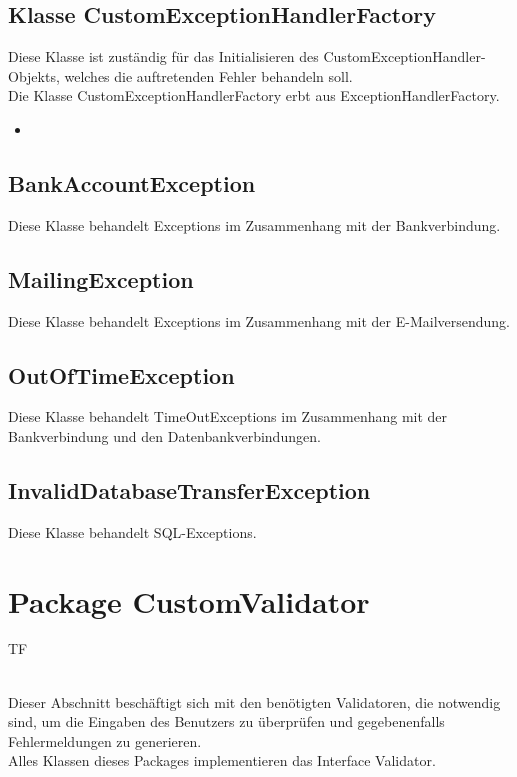 	\subsection{Klasse CustomExceptionHandlerFactory}
	Diese Klasse ist zuständig für das  Initialisieren des CustomExceptionHandler-Objekts, welches die auftretenden Fehler behandeln soll.\\
	Die Klasse CustomExceptionHandlerFactory erbt aus ExceptionHandlerFactory.
	\begin{itemize}
		\item \override
	\end{itemize}
	
	\subsection{BankAccountException}
	Diese Klasse behandelt Exceptions im Zusammenhang mit der Bankverbindung.
	
	\subsection{MailingException}
	Diese Klasse behandelt Exceptions im Zusammenhang mit der E-Mailversendung.
	
	\subsection{OutOfTimeException}
	Diese Klasse behandelt TimeOutExceptions im Zusammenhang mit der Bankverbindung
	und den Datenbankverbindungen.
	
	\subsection{InvalidDatabaseTransferException}
	Diese Klasse behandelt SQL-Exceptions.
	
	\section{Package CustomValidator}
	\begin{tiny}
		TF\\
	\end{tiny}\\
	Dieser Abschnitt beschäftigt sich mit den benötigten Validatoren, die notwendig sind, um die Eingaben des Benutzers zu überprüfen und gegebenenfalls Fehlermeldungen zu generieren.\\
	Alles Klassen dieses Packages implementieren das Interface Validator.
	
